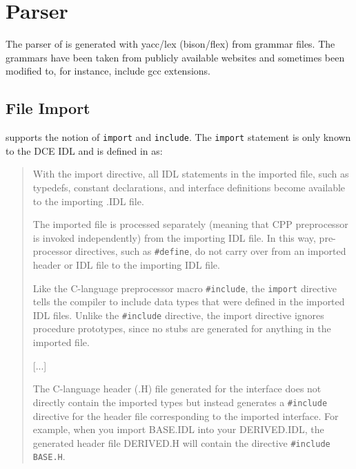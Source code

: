 \section{Parser}

The parser of \dice{} is generated with yacc/lex (bison/flex) from
grammar files.  The grammars have been taken from publicly available
websites and sometimes been modified to, for instance, include gcc
extensions.

\subsection{File Import}
\dice{} supports the notion of \verb|import| and \verb|include|.  The 
\verb|import| statement is only known to the DCE IDL and is defined
in \cite{midl-import} as:

\begin{quote}
With the import directive, all IDL statements in the imported file, 
such as typedefs, constant declarations, and interface definitions 
become available to the importing .IDL file.

The imported file is processed separately (meaning that CPP 
preprocessor is invoked independently) from the importing IDL 
file. In this way, pre-processor directives, such as \verb|#define|, 
do not carry over from an imported header or IDL file to the 
importing IDL file.

Like the C-language preprocessor macro \verb|#include|, the \verb|import|
directive tells the compiler to include data types that were defined 
in the imported IDL files. Unlike the \verb|#include| directive, the 
import directive ignores procedure prototypes, since no stubs are 
generated for anything in the imported file.

[...]

The C-language header (.H) file generated for the interface does 
not directly contain the imported types but instead generates a 
\verb|#include| directive for the header file corresponding to the 
imported interface. For example, when you import BASE.IDL into your 
DERIVED.IDL, the generated header file DERIVED.H will contain the 
directive \verb|#include BASE.H|.


\end{quote}
